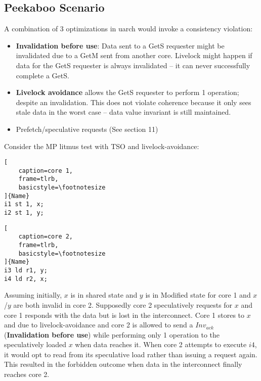 \documentclass{article}
\begin{document}
\begin{multicols*}{2}
\subsection{Peekaboo Scenario}
A combination of 3 optimizations in uarch would invoke a consistency violation:
\begin{itemize}
    \item \textbf{Invalidation before use}: Data sent to a GetS requester might be invalidated due to a GetM sent from another core. Livelock might happen if data for the GetS requester is always invalidated -- it can never successfully complete a GetS. 
    \item \textbf{Livelock avoidance} allows the GetS requester to perform 1 operation; despite an invalidation. This does not violate coherence because it only sees stale data in the worst case -- data value invariant is still maintained.
    \item Prefetch/speculative requests (See section 11)
\end{itemize}

\noindent\newline
Consider the MP litmus test with TSO and livelock-avoidance:

\noindent\begin{minipage}{.2\textwidth}
\captionsetup{labelformat=empty}
\begin{lstlisting}[
    caption=core 1,
    frame=tlrb, 
    basicstyle=\footnotesize
]{Name}
i1 st 1, x;
i2 st 1, y;
\end{lstlisting}
\end{minipage}\hfill
\begin{minipage}{.2\textwidth}
\captionsetup{labelformat=empty}
\begin{lstlisting}[
    caption=core 2,
    frame=tlrb,
    basicstyle=\footnotesize
]{Name}
i3 ld r1, y;
i4 ld r2, x;
\end{lstlisting}
\end{minipage}

\noindent\newline
Assuming initially, $x$ is in shared state and $y$ is in Modified state for core 1 and $x$/$y$ are both invalid in core 2. Supposedly core 2 speculatively requests for $x$ and core 1 responds with the data but is lost in the interconnect. Core 1 stores to $x$ and due to livelock-avoidance and core 2 is allowed to send a $Inv_{ack}$ (\textbf{Invalidation before use}) while performing only 1 operation to the speculatively loaded $x$ when data reaches it. When core 2 attempts to execute $i4$, it would opt to read from its speculative load rather than issuing a request again. This resulted in the forbidden outcome when data in the interconnect finally reaches core 2.


\end{multicols*}
\end{document}
